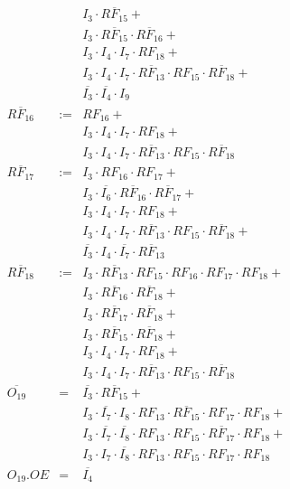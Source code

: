 \documentclass[a4paper,russian]{report}
\begin{document}
\begin{eqnarray*}
	& &  I_{3} \cdotp \overline{RF_{15}} + \\
	& &  I_{3} \cdotp \overline{RF_{15}} \cdotp \overline{RF_{16}} + \\
	& &  I_{3} \cdotp I_{4} \cdotp I_{7} \cdotp RF_{18} + \\
	& &  I_{3} \cdotp I_{4} \cdotp I_{7} \cdotp \overline{RF_{13}} \cdotp RF_{15} \cdotp \overline{RF_{18}} + \\
	& &  \overline{I_{3}} \cdotp \overline{I_{4}} \cdotp I_{9} \\
    \overline{RF_{16}} & := & RF_{16} + \\
	& &  I_{3} \cdotp I_{4} \cdotp I_{7} \cdotp RF_{18} + \\
	& &  I_{3} \cdotp I_{4} \cdotp I_{7} \cdotp \overline{RF_{13}} \cdotp RF_{15} \cdotp \overline{RF_{18}} \\
    \overline{RF_{17}} & := & I_{3} \cdotp RF_{16} \cdotp RF_{17} + \\
	& &  I_{3} \cdotp \overline{I_{6}} \cdotp \overline{RF_{16}} \cdotp \overline{RF_{17}} + \\
	& &  I_{3} \cdotp I_{4} \cdotp I_{7} \cdotp RF_{18} + \\
	& &  I_{3} \cdotp I_{4} \cdotp I_{7} \cdotp \overline{RF_{13}} \cdotp RF_{15} \cdotp \overline{RF_{18}} + \\
	& &  \overline{I_{3}} \cdotp I_{4} \cdotp \overline{I_{7}} \cdotp \overline{RF_{13}} \\
    \overline{RF_{18}} & := & I_{3} \cdotp \overline{RF_{13}} \cdotp RF_{15} \cdotp RF_{16} \cdotp RF_{17} \cdotp RF_{18} + \\
	& &  I_{3} \cdotp \overline{RF_{16}} \cdotp \overline{RF_{18}} + \\
	& &  I_{3} \cdotp \overline{RF_{17}} \cdotp \overline{RF_{18}} + \\
	& &  I_{3} \cdotp \overline{RF_{15}} \cdotp \overline{RF_{18}} + \\
	& &  I_{3} \cdotp I_{4} \cdotp I_{7} \cdotp RF_{18} + \\
	& &  I_{3} \cdotp I_{4} \cdotp I_{7} \cdotp \overline{RF_{13}} \cdotp RF_{15} \cdotp \overline{RF_{18}} \\
    \overline{O_{19}} & = & \overline{I_{3}} \cdotp \overline{RF_{15}} + \\
	& &  I_{3} \cdotp \overline{I_{7}} \cdotp I_{8} \cdotp RF_{13} \cdotp \overline{RF_{15}} \cdotp RF_{17} \cdotp RF_{18} + \\
	& &  I_{3} \cdotp \overline{I_{7}} \cdotp \overline{I_{8}} \cdotp RF_{13} \cdotp RF_{15} \cdotp \overline{RF_{17}} \cdotp RF_{18} + \\
	& &  I_{3} \cdotp I_{7} \cdotp \overline{I_{8}} \cdotp RF_{13} \cdotp RF_{15} \cdotp RF_{17} \cdotp RF_{18} \\
    O_{19}.OE & = & \overline{I_{4}} \\ \\
 \end{eqnarray*}
\pagebreak[1]
\end{document}
